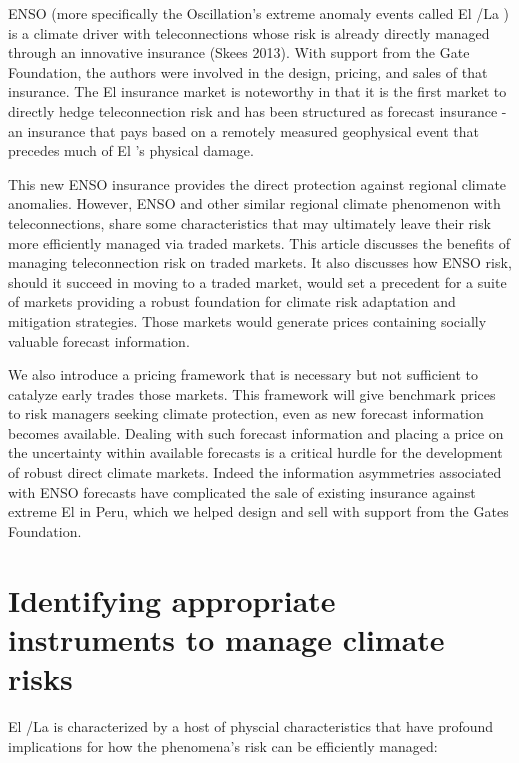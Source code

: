 \documentclass[article]{jss}
\begin{document}
ENSO (more specifically the Oscillation's extreme anomaly events called
El /La ) is a climate driver with
teleconnections whose risk is already directly managed through an
innovative insurance (Skees 2013). With support from the Gate
Foundation, the authors were involved in the design, pricing, and sales
of that insurance. The El  insurance market is noteworthy
in that it is the first market to directly hedge teleconnection risk and
has been structured as forecast insurance - an insurance that pays based
on a remotely measured geophysical event that precedes much of El
's physical damage.

This new ENSO insurance provides the direct protection against regional
climate anomalies. However, ENSO and other similar regional climate
phenomenon with teleconnections, share some characteristics that may
ultimately leave their risk more efficiently managed via traded markets.
This article discusses the benefits of managing teleconnection risk on
traded markets. It also discusses how ENSO risk, should it succeed in
moving to a traded market, would set a precedent for a suite of markets
providing a robust foundation for climate risk adaptation and mitigation
strategies. Those markets would generate prices containing socially
valuable forecast information.

We also introduce a pricing framework that is necessary but not
sufficient to catalyze early trades those markets. This framework will
give benchmark prices to risk managers seeking climate protection, even
as new forecast information becomes available. Dealing with such
forecast information and placing a price on the uncertainty within
available forecasts is a critical hurdle for the development of robust
direct climate markets. Indeed the information asymmetries associated
with ENSO forecasts have complicated the sale of existing insurance
against extreme El  in Peru, which we helped design and
sell with support from the Gates Foundation.

\section{Identifying appropriate instruments to manage climate
risks}\label{identifying-appropriate-instruments-to-manage-climate-risks}

El /La  is characterized by a host of physcial
characteristics that have profound implications for how the phenomena's
risk can be efficiently managed:
\end{document}
